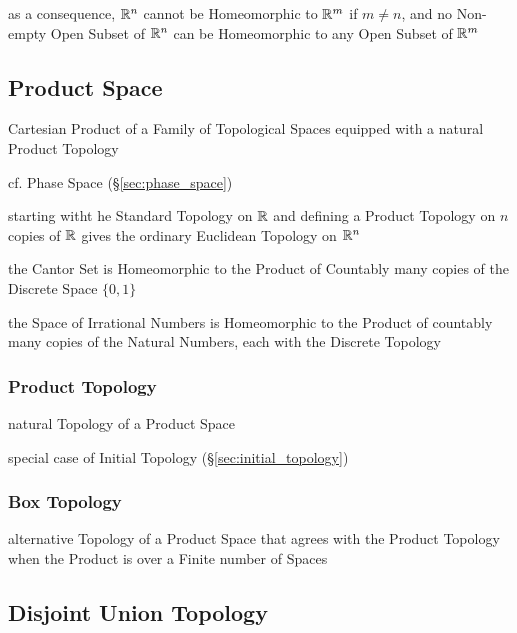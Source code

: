 as a consequence, $\mathbb{R}^n$ cannot be Homeomorphic to $\mathbb{R}^m$ if $m \neq n$,
and no Non-empty Open Subset of $\mathbb{R}^n$ can be Homeomorphic to any Open
Subset of $\mathbb{R}^m$



\subsection{Product Space}\label{sec:product_space}

Cartesian Product of a Family of Topological Spaces equipped with a natural
Product Topology

cf. Phase Space (\S\ref{sec:phase_space})

starting witht he Standard Topology on $\mathbb{R}$ and defining a Product Topology
on $n$ copies of $\mathbb{R}$ gives the ordinary Euclidean Topology on $\mathbb{R}^n$

the Cantor Set is Homeomorphic to the Product of Countably many copies of the
Discrete Space $\{0,1\}$

the Space of Irrational Numbers is Homeomorphic to the Product of countably many
copies of the Natural Numbers, each with the Discrete Topology



\subsubsection{Product Topology}\label{sec:product_topology}

natural Topology of a Product Space

special case of Initial Topology (\S\ref{sec:initial_topology})



\subsubsection{Box Topology}\label{sec:box_topology}

alternative Topology of a Product Space that agrees with the Product Topology
when the Product is over a Finite number of Spaces



\subsection{Disjoint Union Topology}\label{sec:disjoint_union_topology}

